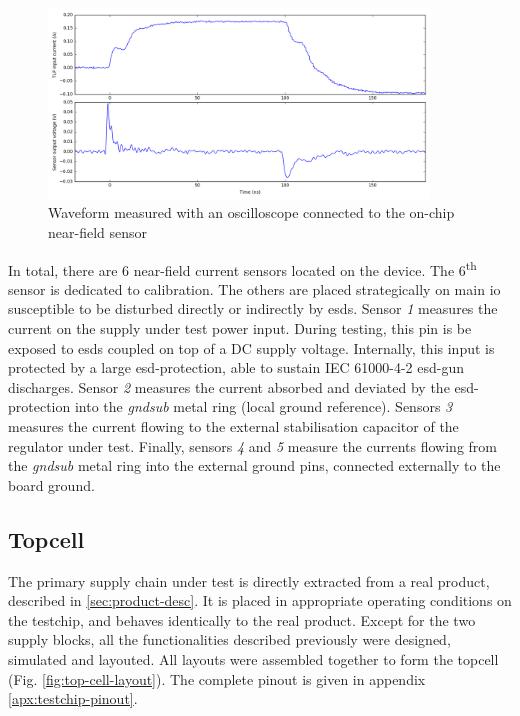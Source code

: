 \begin{figure}[!h]
  \centering
  \includegraphics[width=0.9\textwidth]{src/3/figures/measured_waveform.png}
  \caption{Waveform measured with an oscilloscope connected to the on-chip near-field sensor}
  \label{fig:nfs-wvf}
\end{figure}

In total, there are 6 near-field current sensors located on the device.
The 6\textsuperscript{th} sensor is dedicated to calibration.
The others are placed strategically on main \gls{io} susceptible to be disturbed directly or indirectly by \gls{esd}s.
Sensor \textit{1} measures the current on the supply under test power input.
During testing, this pin is be exposed to \gls{esd}s coupled on top of a DC supply voltage.
Internally, this input is protected by a large \gls{esd-protection}, able to sustain IEC 61000-4-2 \gls{esd-gun} discharges.
Sensor \textit{2} measures the current absorbed and deviated by the \gls{esd-protection} into the \textit{gndsub} metal ring (local ground reference).
Sensors \textit{3} measures the current flowing to the external stabilisation capacitor of the regulator under test.
Finally, sensors \textit{4} and \textit{5} measure the currents flowing from the \textit{gndsub} metal ring into the external ground pins, connected externally to the board ground.

\subsection{Topcell}

%
The primary supply chain under test is directly extracted from a real product, described in \ref{sec:product-desc}.
It is placed in appropriate operating conditions on the testchip, and behaves identically to the real product.
Except for the two supply blocks, all the functionalities described previously were designed, simulated and layouted.
All layouts were assembled together to form the topcell (Fig. \ref{fig:top-cell-layout}).
The complete pinout is given in appendix \ref{apx:testchip-pinout}.

